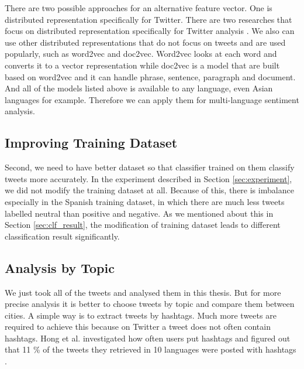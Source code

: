 There are two possible approaches for an alternative feature vector.
One is distributed representation specifically for Twitter.
There are two researches that focus on distributed representation specifically for Twitter analysis \cite{tweet2vec1} \cite{tweet2vec2}.
We also can use other distributed representations that do not focus on tweets and are used popularly, such as word2vec and doc2vec.
Word2vec looks at each word and converts it to a vector representation while doc2vec is a model that are built based on word2vec and it can handle phrase, sentence, paragraph and document.
And all of the models listed above is available to any language, even Asian languages for example.
Therefore we can apply them for multi-language sentiment analysis.

\subsection{Improving Training Dataset}
Second, we need to have better dataset so that classifier trained on them classify tweets more accurately.
In the experiment described in Section \ref{sec:experiment}, we did not modify the training dataset at all.
Because of this, there is imbalance especially in the Spanish training dataset, in which there are much less tweets labelled neutral than positive and negative.
As we mentioned about this in Section \ref{sec:clf_result}, the modification of training dataset leads to different classification result significantly.



\subsection{Analysis by Topic}
We just took all of the tweets and analysed them in this thesis.
But for more precise analysis it is better to choose tweets by topic and compare them between cities.
A simple way is to extract tweets by hashtags.
Much more tweets are required to achieve this because on Twitter a tweet does not often contain hashtags.
Hong et al. investigated how often users put hashtags and figured out that 11 \% of the tweets they retrieved in 10 languages were posted with hashtags \cite{hong}.

